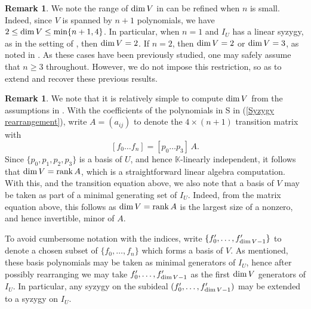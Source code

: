 \documentclass[reqno]{amsart}
\numberwithin{equation}{section}
\theoremstyle{definition}
\newtheorem{rem}[thm]{Remark}
\def\K{\mathbb{K}}
\def\dim{\mathop{\rm dim}}
\def\rk{\mathop{\rm rank}}
\begin{document}
\begin{rem}\label{low n dimension remark}
We note the range of $\dim V$ in  can be refined when $n$ is small. Indeed, since $V$ is spanned by $n+1$ polynomials, we have $2\leq \dim V\leq \min\{n+1,4\}$. In particular, when $n=1$ and $I_U$ has a linear syzygy, as in the setting of \cite{DS16}, then $\dim V=2$. If $n=2$, then $\dim V=2$ or $\dim V=3$, as noted in \cite{Weaver25}. As these cases have been previously studied, one may safely assume that $n\geq 3$ throughout. However, we do not impose this restriction, so as to extend and recover these previous results.
\end{rem}


\begin{rem}\label{first dim V generators}
We note that it is relatively simple to compute $\dim V$ from the assumptions in . With the coefficients of the polynomials in S in (\ref{Syzygy rearrangement}), write $A=(a_{ij})$ to denote the $4\times (n+1)$ transition matrix with
\begin{equation}\label{A transition matrix equation}
[f_0\ldots f_n] = [p_0\ldots p_3]\, A.
\end{equation}
Since $\{p_0,p_1,p_2,p_3\}$ is a basis of $U$, and hence $\K$-linearly independent, it follows that $\dim V =\rk A$, which is a straightforward linear algebra computation. With this, and the transition equation above, we also note that a basis of $V$ may be taken as part of a minimal generating set of $I_U$. Indeed, from the matrix equation above, this follows as $\dim V =\rk A$ is the largest size of a nonzero, and hence invertible, minor of $A$.
\end{rem}



To avoid cumbersome notation with the indices, write $\{f_0',\ldots,f_{\dim V-1}'\}$ to denote a chosen subset of $\{f_0,\ldots,f_n\}$ which forms a basis of $V$. As mentioned, these basis polynomials may be taken as minimal generators of $I_U$, hence after possibly rearranging we may take $f_0',\ldots,f_{\dim V-1}'$ as the first $\dim V$ generators of $I_U$. In particular, any syzygy on the subideal $(f_0',\ldots,f_{\dim V-1}')$ may be extended to a syzygy on $I_U$. 
\end{document}
